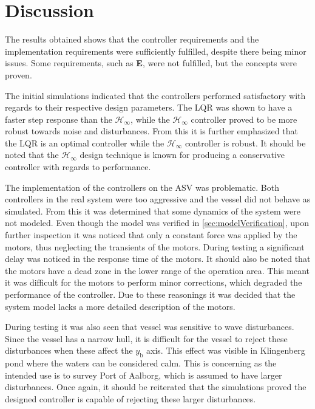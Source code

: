 \chapter{Discussion}\label{chap:discussion}

The results obtained shows that the controller requirements and the implementation requirements were sufficiently fulfilled, despite there being minor issues. Some requirements, such as \textbf{E}, were not fulfilled, but the concepts were proven.

The initial simulations indicated that the controllers performed satisfactory with regards to their respective design parameters. The LQR was shown to have a faster step response than the $\mathcal{H}_\infty$, while the $\mathcal{H}_\infty$ controller proved to be more robust towards noise and disturbances. From this it is further emphasized that the LQR is an optimal controller while the $\mathcal{H}_\infty$ controller is robust. It should be noted that the $\mathcal{H}_\infty$ design technique is known for producing a conservative controller with regards to performance.

The implementation of the controllers on the ASV was problematic. Both controllers in the real system were too aggressive and the vessel did not behave as simulated. From this it was determined that some dynamics of the system were not modeled. Even though the model was verified in \autoref{sec:modelVerification}, upon further inspection it was noticed that only a constant force was applied by the motors, thus neglecting the transients of the motors. During testing a significant delay was noticed in the response time of the motors. It should also be noted that the motors have a dead zone in the lower range of the operation area. This meant it was difficult for the motors to perform minor corrections, which degraded the performance of the controller. Due to these reasonings it was decided that the system model lacks a more detailed description of the motors.

During testing it was also seen that vessel was sensitive to wave disturbances. Since the vessel has a narrow hull, it is difficult for the vessel to reject these disturbances when these affect the $y_\mathrm{b}$ axis. This effect was visible in Klingenberg pond where the waters can be considered calm. This is concerning as the intended use is to survey Port of Aalborg, which is assumed to have larger disturbances. Once again, it should be reiterated that the simulations proved the designed controller is capable of rejecting these larger disturbances.

